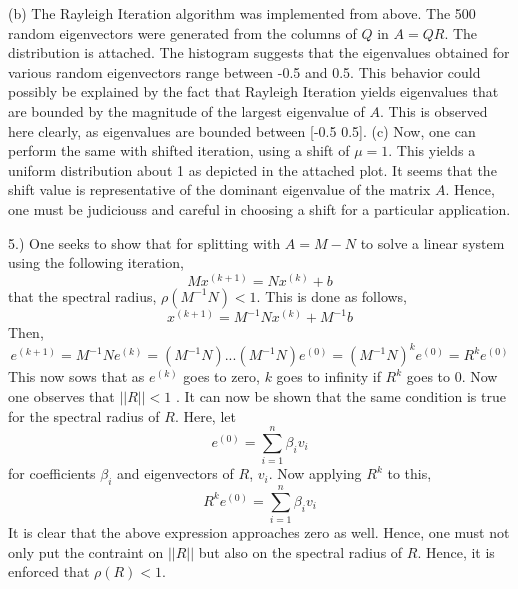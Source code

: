 \documentclass{article}
\begin{document}
 (b) The Rayleigh Iteration algorithm was implemented from above. The 500 random eigenvectors were generated from the columns of $Q$ in $A=QR$.  The distribution is attached. The histogram suggests that the eigenvalues obtained for various random eigenvectors range between -0.5 and  0.5. This behavior could possibly be explained by the fact that Rayleigh Iteration yields eigenvalues that are bounded by the magnitude of the largest eigenvalue of $A$.  This is observed here clearly, as eigenvalues are bounded between [-0.5 0.5]. \newline 
 \newline 
 (c)  Now, one can perform the same with shifted iteration, using a shift of $\mu =1$. This yields a uniform distribution about 1 as depicted in the attached plot. It seems that the shift value is representative of the dominant eigenvalue of the matrix $A$. Hence, one must be judiciouss and careful in choosing a shift for a particular application. 
 
 
5.) \newline \newline 
 One seeks to show that for splitting with $A=M-N$ to solve a linear system using the following iteration, 
 $$Mx^{(k+1)} = Nx^{(k)} +b $$ 
 that the spectral radius, $\rho (M^{-1}N) <1$.  This is done as follows, 
 $$ x^{(k+1)} = M^{-1}Nx^{(k)} +  M^{-1}b $$ 
 Then, 
 $$e^{(k+1)}= M^{-1}Ne^{(k)} = (M^{-1}N)...(M^{-1}N)e^{(0)} =  (M^{-1}N)^{k} e^{(0)} = R^{k}e^{(0)}$$  
 This now sows that as $e^{(k)} $ goes to zero, $k$ goes to infinity if $R^{k}$ goes to 0. Now one observes that $||R|| <1$ . It can now be shown that the same condition is true for the spectral radius of $R$. Here, let 
 $$ e^{(0)} = \sum_{i=1}^{n} \beta_{i} v_{i}$$ 
 for coefficients $\beta_{i}$ and eigenvectors of $R$, $v_{i}$. Now applying $R^{k}$ to this, 
 $$ R^{k}e^{(0)}  =  \sum_{i=1}^{n} \beta_{i} v_{i} $$ 
 It is clear that the above expression approaches zero as well. Hence, one must not only put the contraint on $||R||$ but also on the spectral radius of $R$. Hence, it is enforced that $\rho (R) <1$. 
  
 
\end{document}
